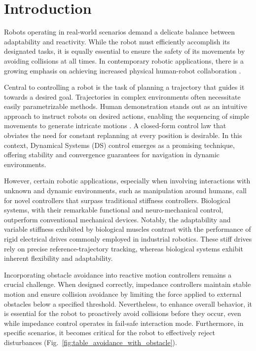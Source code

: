 \section{Introduction}
Robots operating in real-world scenarios demand a delicate balance between adaptability and reactivity. While the robot must efficiently accomplish its designated tasks, it is equally essential to ensure the safety of its movements by avoiding collisions at all times. In contemporary robotic applications, there is a growing emphasis on achieving increased physical human-robot collaboration \cite{ajoudani2018progress}.

Central to controlling a robot is the task of planning a trajectory that guides it towards a desired goal. Trajectories in complex environments often necessitate easily parametrizable methods. Human demonstration stands out as an intuitive approach to instruct robots on desired actions, enabling the sequencing of simple movements to generate intricate motions \cite{gribovskaya2011motion}. 
A closed-form control law that obviates the need for constant replanning at every position is desirable. In this context, Dynamical Systems (DS) control emerges as a promising technique, offering stability and convergence guarantees for navigation in dynamic environments.

However, certain robotic applications, especially when involving interactions with unknown and dynamic environments, such as manipulation around humans, call for novel controllers that surpass traditional stiffness controllers. Biological systems, with their remarkable functional and neuro-mechanical control, outperform conventional mechanical devices. Notably, the adaptability and variable stiffness exhibited by biological muscles contrast with the performance of rigid electrical drives commonly employed in industrial robotics. These stiff drives rely on precise reference-trajectory tracking, whereas biological systems exhibit inherent flexibility and adaptability.

Incorporating obstacle avoidance into reactive motion controllers remains a crucial challenge. When designed correctly, impedance controllers maintain stable motion and ensure collision avoidance by limiting the force applied to external obstacles below a specified threshold. Nevertheless, to enhance overall behavior, it is essential for the robot to proactively avoid collisions before they occur, even while impedance control operates in fail-safe interaction mode. Furthermore, in specific scenarios, it becomes critical for the robot to effectively reject disturbances (Fig.~\ref{fig:table_avoidance_with_obstacle}). 

